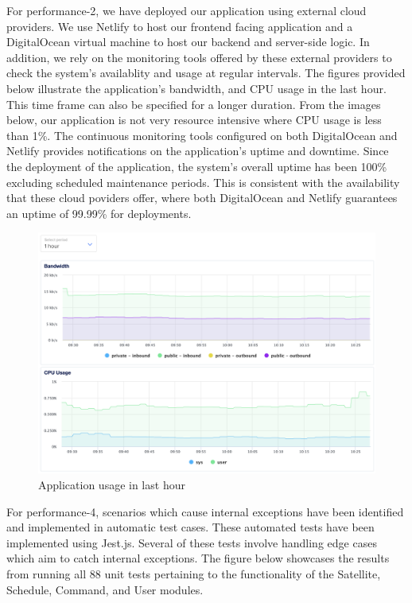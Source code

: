 \documentclass[12pt, titlepage]{article}
\begin{document}
For performance-2, we have deployed our application using external cloud providers. We use Netlify to host our frontend facing application and a DigitalOcean virtual machine to host our backend and server-side logic. In addition, we rely on the monitoring tools offered by these external providers to check the system's availablity and usage at regular intervals. The figures provided below illustrate the application's bandwidth, and CPU usage in the last hour. This time frame can also be specified for a longer duration. From the images below, our application is not very resource intensive where CPU usage is less than 1\%. The continuous monitoring tools configured on both DigitalOcean and Netlify provides notifications on the application's uptime and downtime. Since the deployment of the application, the system's overall uptime has been 100\% excluding scheduled maintenance periods. This is consistent with the availability that these cloud poviders offer, where both DigitalOcean and Netlify guarantees an uptime of 99.99\% for deployments.

\begin{figure}[h]
\centering
\includegraphics[width=1\textwidth]{performance-metrics.png}
\caption{Application usage in last hour}
\label{fig:myimage}
\end{figure}

\newpage

For performance-4, scenarios which cause internal exceptions have been identified and implemented in automatic test cases. These automated tests have been implemented using Jest.js. Several of these tests involve handling edge cases which aim to catch internal exceptions. The figure below showcases the results from running all 88 unit tests pertaining to the functionality of the Satellite, Schedule, Command, and User modules.
\end{document}

